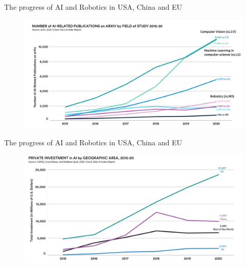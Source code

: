 {

\begin{frame}{The progress of AI and Robotics in USA, China and EU}

\begin{figure}
 \centering
 \includegraphics[width=1.0\textwidth]{./figures/progress-of-air-b/outputs/drawing-v00.png}
\end{figure}

\end{frame}
}



{

\begin{frame}{The progress of AI and Robotics in USA, China and EU}

\begin{figure}
 \centering
 \includegraphics[width=1.0\textwidth]{./figures/progress-of-air-c/outputs/drawing-v00.png}
\end{figure}

\end{frame}
}



